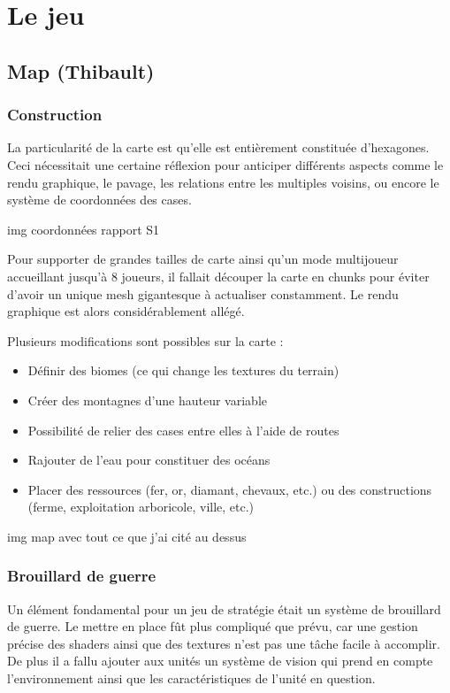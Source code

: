 \documentclass[12pt]{report}
\begin{document}
\chapter{Le jeu}

\section{Map (Thibault)}

\subsection{Construction}

La particularité de la carte est qu’elle est entièrement constituée d’hexagones.
Ceci nécessitait une certaine réflexion pour anticiper différents aspects comme
le rendu graphique, le pavage, les relations entre les multiples voisins, ou
encore le système de coordonnées des cases.

img coordonnées rapport S1

Pour supporter de grandes tailles de carte ainsi qu’un mode multijoueur
accueillant jusqu’à 8 joueurs, il fallait découper la carte en chunks pour
éviter d’avoir un unique mesh gigantesque à actualiser constamment. Le rendu
graphique est alors considérablement allégé.

Plusieurs modifications sont possibles sur la carte :

\begin{itemize}
    \item Définir des biomes (ce qui change les textures du terrain)
    \item Créer des montagnes d’une hauteur variable
    \item Possibilité de relier des cases entre elles à l’aide de routes
    \item Rajouter de l’eau pour constituer des océans
    \item Placer des ressources (fer, or, diamant, chevaux, etc.) ou des
        constructions (ferme, exploitation arboricole, ville, etc.)
\end{itemize}

img map avec tout ce que j’ai cité au dessus

\subsection{Brouillard de guerre}

Un élément fondamental pour un jeu de stratégie était un système de brouillard
de guerre. Le mettre en place fût plus compliqué que prévu, car une gestion
précise des shaders ainsi que des textures n’est pas une tâche facile à
accomplir. De plus il a fallu ajouter aux unités un système de vision qui prend
en compte l’environnement ainsi que les caractéristiques de l’unité en question.
\end{document}
